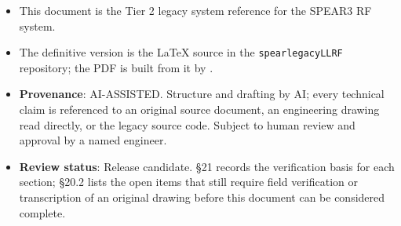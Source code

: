 \begin{itemize}
\tightlist
\item
  This document is the Tier 2 legacy system reference for the SPEAR3 RF system.
\item
  The definitive version is the LaTeX source  in the \texttt{spearlegacyLLRF} repository; the PDF is built from it by .
\item
  \textbf{Provenance}: AI-ASSISTED. Structure and drafting by AI; every technical claim is referenced to an original source document, an engineering drawing read directly, or the legacy source code. Subject to human review and approval by a named engineer.
\item
  \textbf{Review status}: Release candidate. §21 records the verification basis for each section; §20.2 lists the open items that still require field verification or transcription of an original drawing before this document can be considered complete.
\end{itemize}

